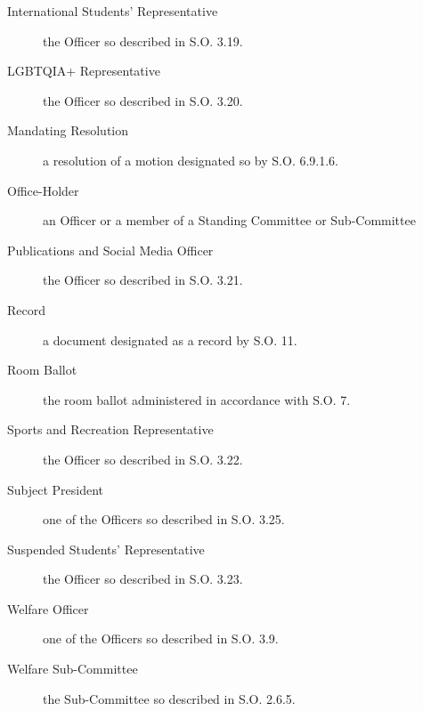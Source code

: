 \begin{description}
\item[International Students' Representative] the Officer so described in S.O. 3.19.
\item[LGBTQIA+ Representative] the Officer so described in S.O. 3.20.
\item[Mandating Resolution] a resolution of a motion designated so by S.O. 6.9.1.6.
\item[Office-Holder] an Officer or a member of a Standing Committee or Sub-Committee
\item[Publications and Social Media Officer] the Officer so described in S.O. 3.21.
\item[Record] a document designated as a record by S.O. 11.
\item[Room Ballot] the room ballot administered in accordance with S.O. 7.
\item[Sports and Recreation Representative] the Officer so described in S.O. 3.22.
\item[Subject President] one of the Officers so described in S.O. 3.25.
\item[Suspended Students’ Representative] the Officer so described in S.O. 3.23.
\item[Welfare Officer] one of the Officers so described in S.O. 3.9.
\item[Welfare Sub-Committee] the Sub-Committee so described in S.O. 2.6.5.
\end{description}